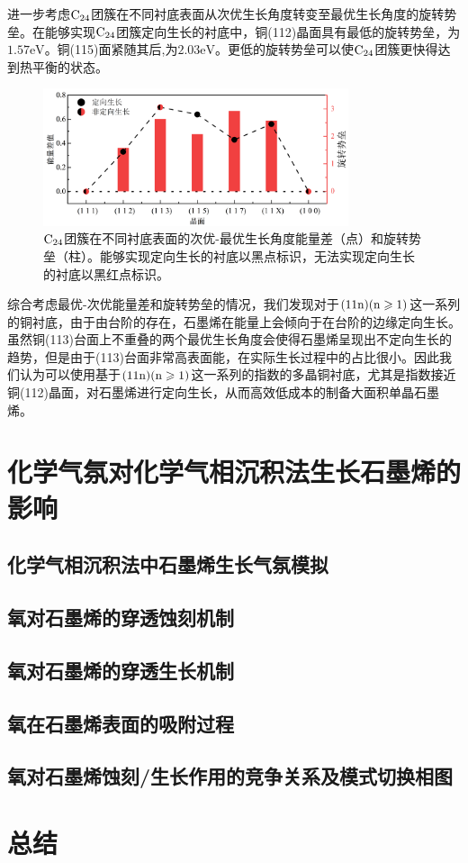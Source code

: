         进一步考虑$\rm{C_{24}}$团簇在不同衬底表面从次优生长角度转变至最优生长角度的旋转势垒。在能够实现$\rm{C_{24}}$团簇定向生长的衬底中，铜(112)晶面具有最低的旋转势垒，为$1.57 \si{\electronvolt}$。铜(115)面紧随其后,为$2.03 \si{\electronvolt}$。更低的旋转势垒可以使$\rm{C_{24}}$团簇更快得达到热平衡的状态。

        \begin{figure}[!htb]
            \includegraphics[width=0.8\textwidth]{pic/GO_C24_energyDiff_barrier.png}
            \caption{$\rm{C_{24}}$团簇在不同衬底表面的次优-最优生长角度能量差（点）和旋转势垒（柱）。能够实现定向生长的衬底以黑点标识，无法实现定向生长的衬底以黑红点标识。}
            \label{fig:GO_C24_energyDiff_barrier}
        \end{figure}  

        综合考虑最优-次优能量差和旋转势垒的情况，我们发现对于$\rm{(11n)(n \geqslant 1)}$这一系列的铜衬底，由于由台阶的存在，石墨烯在能量上会倾向于在台阶的边缘定向生长。虽然铜(113)台面上不重叠的两个最优生长角度会使得石墨烯呈现出不定向生长的趋势，但是由于(113)台面非常高表面能，在实际生长过程中的占比很小。因此我们认为可以使用基于$\rm{(11n)(n \geqslant 1)}$这一系列的指数的多晶铜衬底，尤其是指数接近铜(112)晶面，对石墨烯进行定向生长，从而高效低成本的制备大面积单晶石墨烯。

\section{化学气氛对化学气相沉积法生长石墨烯的影响}
\label{sec:石墨烯氧蚀刻穿透}
    \subsection{化学气相沉积法中石墨烯生长气氛模拟}
    \subsection{氧对石墨烯的穿透蚀刻机制}
    \subsection{氧对石墨烯的穿透生长机制}
    \subsection{氧在石墨烯表面的吸附过程}
    \subsection{氧对石墨烯蚀刻/生长作用的竞争关系及模式切换相图}
\section{总结}

